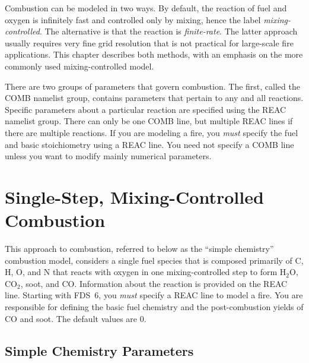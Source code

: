 \documentclass[11pt]{book}
\begin{document}
Combustion can be modeled in two ways. By default, the reaction of fuel and oxygen is infinitely fast and controlled only by mixing, hence the label {\em mixing-controlled}. The alternative is that the reaction is {\em finite-rate}. The latter approach usually requires very fine grid resolution that is not practical for large-scale fire applications. This chapter describes both methods, with an emphasis on the more commonly used mixing-controlled model.

There are two groups of parameters that govern combustion. The first, called the {\ct COMB} namelist group, contains parameters that pertain to any and all reactions. Specific parameters about a particular reaction are specified using the {\ct REAC} namelist group. There can only be one {\ct COMB} line, but multiple {\ct REAC} lines if there are multiple reactions. If you are modeling a fire, you {\em must} specify the fuel and basic stoichiometry using a {\ct REAC} line. You need not specify a {\ct COMB} line unless you want to modify mainly numerical parameters.


\section{Single-Step, Mixing-Controlled Combustion}

This approach to combustion, referred to below as the ``simple chemistry'' combustion model, considers a single fuel species that is composed primarily of C, H, O, and N that reacts with oxygen in one mixing-controlled step to form H$_2$O, CO$_2$, soot, and CO. Information about the reaction is provided on the {\ct REAC} line. Starting with FDS~6, you {\em must} specify a {\ct REAC} line to model a fire. You are responsible for defining the basic fuel chemistry and the post-combustion yields of CO and soot. The default values are 0.

\subsection{Simple Chemistry Parameters}
\label{info:simple_chemistry}
\end{document}
